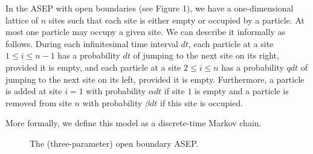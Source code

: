 \documentclass[11pt]{amsart}
\theoremstyle{definition}
\theoremstyle{remark}
\begin{document}
In the ASEP with open boundaries (see Figure 1), 
we have a one-dimensional
lattice of $n$ sites such that each site is either empty or occupied by 
a particle.  At most one particle may occupy a
given site.  
We can describe it informally as follows.
During each infinitesimal time interval $\mathit{dt}$, each particle at a site
$1\leq i \leq n-1$ 
has a probability $\mathit{dt}$ of jumping to the next
site on its right,
	provided it is empty, and each particle at a site $2\leq i \leq n$
	has 
a probability $q \mathit{dt}$ of jumping to the next site on its left,
	provided
	it is empty.  Furthermore, a particle
is added at site $i=1$ with probability $\alpha \mathit{dt}$ if site $1$
is empty and a particle is removed from site $n$ with probability
$\beta \mathit{dt}$ if this site is occupied.

More formally, we define this model as a 
discrete-time Markov chain.
\begin{figure}[h]
	\caption{The (three-parameter) open boundary ASEP.}\label{fig:1} 
\end{figure}

	
\end{document}
